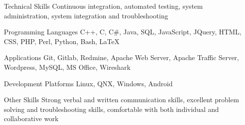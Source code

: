 
\begin{cvskills}
  \newline \vspace{1mm}
  \cvskill
    {Technical Skills} %
    {Continuous integration, automated testing, system administration, system integration and troubleshooting} %
  \newline \vspace{1mm}

  \cvskill
    {Programming Languages} %
    {C++, C, C\#, Java, SQL, JavaScript, JQuery, HTML, CSS, PHP, Perl, Python, Bash, LaTeX} %
  \newline \vspace{1mm}

  \cvskill
    {Applications}
    {Git, Gitlab, Redmine, Apache Web Server, Apache Traffic Server, Wordpress, MySQL, MS Office, Wireshark}
  \newline \vspace{1mm}

  \cvskill
    {Development Platforms}
    {Linux, QNX, Windows, Android}
  \newline \vspace{1mm}

  \cvskill
	{Other Skills}
	{Strong verbal and written communication skills, excellent problem solving and troubleshooting skills, comfortable with both individual and collaborative work}

\end{cvskills}
